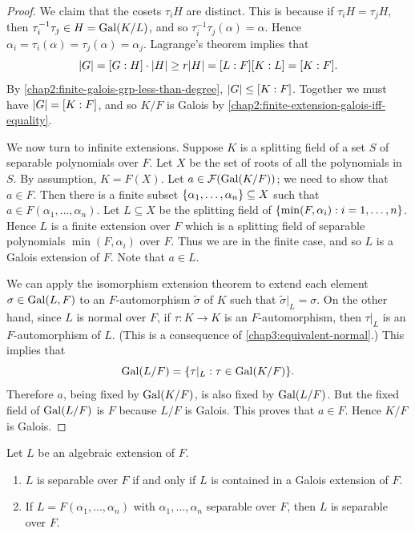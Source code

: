 \begin{proof}
	We claim that the cosets $\tau_i H$ are distinct. This is because if $\tau_i H = \tau_j H$, then $\tau_i^{-1}\tau_j \in H = \operatorname{Gal}(K/L)$, and so $\tau_i^{-1}\tau_j(\alpha) = \alpha$. Hence $\alpha_i = \tau_i(\alpha) = \tau_j(\alpha) =\alpha_j$. Lagrange's theorem implies that
	\begin{equation*}
		\lvert G\rvert = [G : H]\cdot \lvert H\rvert \geq r \lvert H\rvert = [L : F][K : L] = [K : F].
	\end{equation*}
	By \cref{chap2:finite-galois-grp-less-than-degree}, $\lvert G\rvert \leq [K : F]$. Together we must have $\lvert G\rvert = [K : F]$, and so $K/F$ is Galois by \cref{chap2:finite-extension-galois-iff-equality}.
	
	We now turn to infinite extensions. Suppose $K$ is a splitting field of a set $S$ of separable polynomials over $F$. Let $X$ be the set of roots of all the polynomials in $S$. By assumption, $K = F(X)$. Let $a \in \mathcal{F}(\operatorname{Gal}(K/F))$; we need to show that $a \in F$. Then there is a finite subset $\lbrace\alpha_1, \dotsc, \alpha_n\rbrace \subseteq X$ such that $a \in F(\alpha_1, \dotsc, \alpha_n)$. Let $L \subseteq X$ be the splitting field of $\lbrace\min(F, \alpha_i) : i = 1, \dotsc, n\rbrace$. Hence $L$ is a finite extension over $F$ which is a splitting field of separable polynomials $\min(F, \alpha_i)$ over $F$. Thus we are in the finite case, and so $L$ is a Galois extension of $F$. Note that $a \in L$.
	
	We can apply the isomorphism extension theorem to extend each element $\sigma \in \operatorname{Gal}(L, F)$ to an $F$-automorphism $\tilde{\sigma}$ of $K$ such that $\tilde{\sigma}|_L = \sigma$. On the other hand, since $L$ is normal over $F$, if $\tau \colon K \to K$ is an $F$-automorphism, then $\tau|_L$ is an $F$-automorphism of $L$. (This is a consequence of \cref{chap3:equivalent-normal}.) This implies that
	\begin{equation*}
		\Gal(L/F) = \Set*{\tau|_L : \tau \in \Gal(K/F)}.
	\end{equation*}
	Therefore $a$, being fixed by $\operatorname{Gal}(K/F)$, is also fixed by $\operatorname{Gal}(L/F)$. But the fixed field of $\operatorname{Gal}(L/F)$ is $F$ because $L/F$ is Galois. This proves that $a \in F$. Hence $K/F$ is Galois.
\end{proof}

\begin{corollary}
	Let $L$ be an algebraic extension of $F$.
	
	\begin{enumerate}
		\item $L$ is separable over $F$ if and only if $L$ is contained in a Galois extension of $F$.
		
		\item If $L = F(\alpha_1, \dotsc, \alpha_n)$ with $\alpha_1, \dotsc, \alpha_n$ separable over $F$, then $L$ is separable over $F$.
	\end{enumerate}
\end{corollary}

